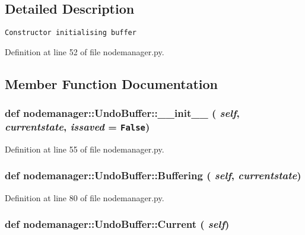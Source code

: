 \subsection{Detailed Description}


\footnotesize\begin{verbatim}
Constructor initialising buffer
\end{verbatim}
\normalsize
 



Definition at line 52 of file nodemanager.py.

\subsection{Member Function Documentation}
\hypertarget{classnodemanager_1_1UndoBuffer_f7faebec57947fa103b8ad9d2b726f04}{
\subsubsection[\_\-\_\-init\_\-\_\-]{\setlength{\rightskip}{0pt plus 5cm}def nodemanager::Undo\-Buffer::\_\-\_\-init\_\-\_\- ( {\em self},  {\em currentstate},  {\em issaved} = {\tt False})}}
\label{classnodemanager_1_1UndoBuffer_f7faebec57947fa103b8ad9d2b726f04}




Definition at line 55 of file nodemanager.py.\hypertarget{classnodemanager_1_1UndoBuffer_22639d6b02995759c718dbb775bc8b7d}{
\subsubsection[Buffering]{\setlength{\rightskip}{0pt plus 5cm}def nodemanager::Undo\-Buffer::Buffering ( {\em self},  {\em currentstate})}}
\label{classnodemanager_1_1UndoBuffer_22639d6b02995759c718dbb775bc8b7d}




Definition at line 80 of file nodemanager.py.\hypertarget{classnodemanager_1_1UndoBuffer_8f121c407be19f42f10ccc2518227dd3}{
\subsubsection[Current]{\setlength{\rightskip}{0pt plus 5cm}def nodemanager::Undo\-Buffer::Current ( {\em self})}}
\label{classnodemanager_1_1UndoBuffer_8f121c407be19f42f10ccc2518227dd3}




